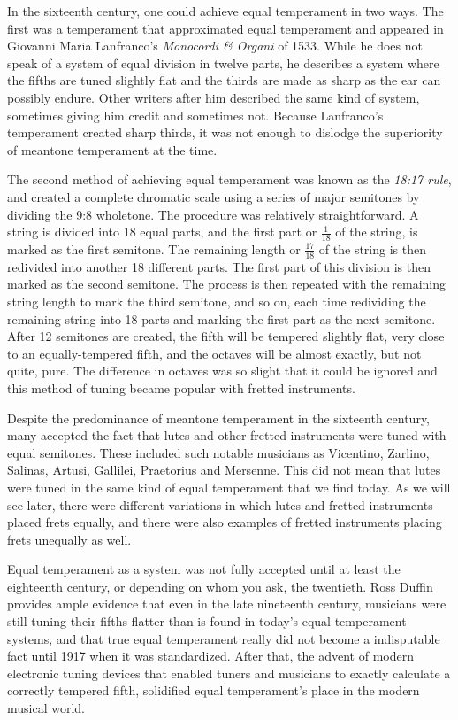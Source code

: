 In the sixteenth century, one could achieve equal temperament in two ways.  The first was
a temperament that approximated equal temperament and appeared in Giovanni Maria
Lanfranco's \textit{Monocordi \& Organi} of 1533. While he does not speak of a system of
equal division in twelve parts, he describes a system where the fifths are tuned slightly
flat and the thirds are made as sharp as the ear can possibly endure. \autocite[45]{MB:1}
Other writers after him described the same kind of system, sometimes giving him credit and
sometimes not.  Because Lanfranco's temperament created sharp thirds, it was not enough to
dislodge the superiority of meantone temperament at the time.

The second method of achieving equal temperament was known as the \textit{18:17 rule}, and
created a complete chromatic scale using a series of major semitones by dividing the 9:8
wholetone.  The procedure was relatively straightforward.  A string is divided into 18
equal parts, and the first part or $ \frac{1}{18} $ of the string, is marked as the first
semitone.  The remaining length or $ \frac{17}{18} $ of the string is then redivided into
another 18 different parts.  The first part of this division is then marked as the second
semitone.  The process is then repeated with the remaining string length to mark the third
semitone, and so on, each time redividing the remaining string into 18 parts and marking
the first part as the next semitone.  After 12 semitones are created, the fifth will be
tempered slightly flat, very close to an equally-tempered fifth, and the octaves will be
almost exactly, but not quite, pure.  The difference in octaves was so slight that it
could be ignored and this method of tuning became popular with fretted instruments.

Despite the predominance of meantone temperament in the sixteenth century, many accepted
the fact that lutes and other fretted instruments were tuned with equal semitones.  These
included such notable musicians as Vicentino, Zarlino, Salinas, Artusi, Gallilei,
Praetorius and Mersenne. \autocite[19]{ML:1} This did not mean that lutes were tuned in
the same kind of equal temperament that we find today. As we will see later, there were
different variations in which lutes and fretted instruments placed frets equally, and
there were also examples of fretted instruments placing frets unequally as well.

Equal temperament as a system was not fully accepted until at least the eighteenth
century, or depending on whom you ask, the twentieth.  Ross Duffin provides ample evidence
that even in the late nineteenth century, musicians were still tuning their fifths flatter
than is found in today's equal temperament systems, and that true equal temperament really
did not become a indisputable fact until 1917 when it was standardized.
\autocite[138]{RD:1}  After that, the advent of modern electronic tuning devices that
enabled tuners and musicians to exactly calculate a correctly tempered fifth, solidified
equal temperament's place in the modern musical world.

